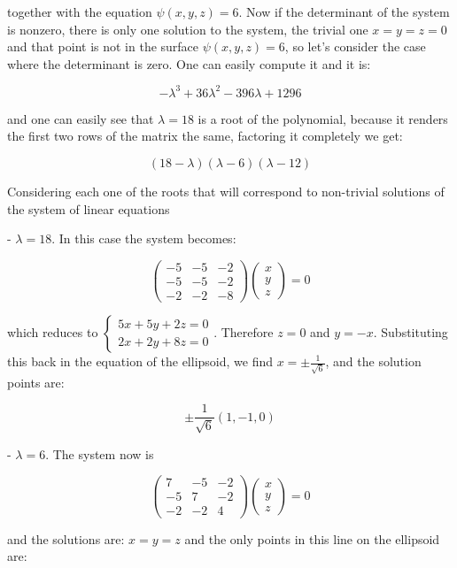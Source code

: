 \documentclass[10pt]{article}
\begin{document}
together with the equation $\psi(x, y, z)=6$. Now if the determinant of the system is nonzero, there is only one solution to the system, the trivial one $x=y=z=0$ and that point is not in the surface $\psi(x, y, z)=6$, so let's consider the case where the determinant is zero. One can easily compute it and it is:

$$
-\lambda^{3}+36 \lambda^{2}-396 \lambda+1296
$$

and one can easily see that $\lambda=18$ is a root of the polynomial, because it renders the first two rows of the matrix the same, factoring it completely we get:

$$
(18-\lambda)(\lambda-6)(\lambda-12)
$$

Considering each one of the roots that will correspond to non-trivial solutions of the system of linear equations

- $\lambda=18$. In this case the system becomes:

$$
\left(\begin{array}{lll}
-5 & -5 & -2 \\
-5 & -5 & -2 \\
-2 & -2 & -8
\end{array}\right)\left(\begin{array}{l}
x \\
y \\
z
\end{array}\right)=0
$$

which reduces to $\left\{\begin{array}{l}5 x+5 y+2 z=0 \\ 2 x+2 y+8 z=0\end{array}\right.$. Therefore $z=0$ and $y=-x$. Substituting this back in the equation of the ellipsoid, we find $x=\pm \frac{1}{\sqrt{6}}$,
and the solution points are:

$$
\pm \frac{1}{\sqrt{6}}(1,-1,0)
$$

- $\lambda=6$. The system now is

$$
\left(\begin{array}{rrr}
7 & -5 & -2 \\
-5 & 7 & -2 \\
-2 & -2 & 4
\end{array}\right)\left(\begin{array}{l}
x \\
y \\
z
\end{array}\right)=0
$$

and the solutions are: $x=y=z$ and the only points in this line on the ellipsoid are:
\end{document}
